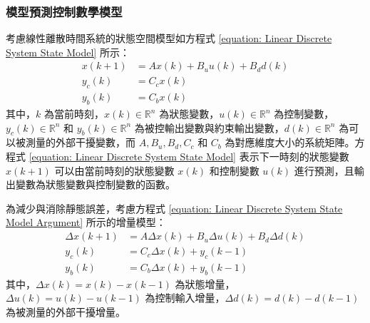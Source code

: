 \subsubsection{模型預測控制數學模型}

考慮線性離散時間系統的狀態空間模型如方程式 \eqref{equation: Linear Discrete System State Model} 所示：
%
\begin{equation}\label{equation: Linear Discrete System State Model}
  \begin{aligned}
    x(k + 1)  & = Ax(k) + B_{u} u(k) + B_{d} d(k) \\
    y_{c} (k) & = C_{c} x(k)                      \\
    y_{b} (k) & = C_{b} x(k)
  \end{aligned}
\end{equation}
%
其中，$k$ 為當前時刻，$x(k) \in \mathbb{R}^{n}$ 為狀態變數，$u(k) \in \mathbb{R}^{n}$ 為控制變數，$y_{c}(k) \in \mathbb{R}^{n}$ 和 $y_{b} (k) \in \mathbb{R}^{n}$ 為被控輸出變數與約束輸出變數，$d(k) \in \mathbb{R}^{n}$ 為可以被測量的外部干擾變數，而 $A, B_{u}, B_{d}, C_{c}$ 和 $C_{b}$ 為對應維度大小的系統矩陣。方程式 \eqref{equation: Linear Discrete System State Model} 表示下一時刻的狀態變數 $x(k + 1)$ 可以由當前時刻的狀態變數 $x(k)$ 和控制變數 $u(k)$ 進行預測，且輸出變數為狀態變數與控制變數的函數。

為減少與消除靜態誤差，考慮方程式 \eqref{equation: Linear Discrete System State Model Argument} 所示的增量模型：
%
\begin{equation}\label{equation: Linear Discrete System State Model Argument}
  \begin{aligned}
    \Delta x(k + 1) & = A \Delta x(k) + B_{u} \Delta u(k) + B_{d} \Delta d(k) \\
    y_{c} (k)       & = C_{c} \Delta x(k) + y_{c} (k-1)                       \\
    y_{b} (k)       & = C_{b} \Delta x(k) + y_{b} (k-1)
  \end{aligned}
\end{equation}
%
其中，$\Delta x(k) = x(k) - x(k-1)$ 為狀態增量，$\Delta u(k) = u(k) - u(k-1)$ 為控制輸入增量，$\Delta d(k) = d(k) - d(k-1)$ 為被測量的外部干擾增量。


